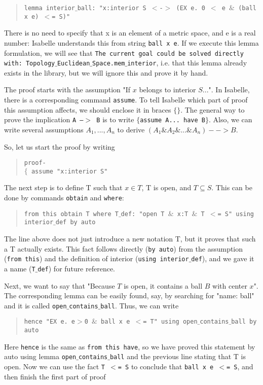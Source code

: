 \documentclass[11pt]{article}
\newcommand{\prog}[1]{\par\noindent\begin{quote}#1\end{quote}\par\noindent}
\begin{document}
\prog{\tt lemma interior$\_$ball: "x:interior S $<$-$>$ (EX e. 0 $<$ e $\&$ (ball x e) $<$= S)"}%

There is no need to specify that x is an element of a metric space, and e is a real number: Isabelle understands this from string {\tt ball x e}. If we execute this lemma formulation, we will see that {\tt The current goal could be solved directly with:~Topology$\_$Euclidean$\_$Space.mem$\_$interior}, i.e. that this lemma already exists in the library, but we will ignore this and prove it by hand.

The proof starts with the assumption "If $x$ belongs to interior $S$...". In Isabelle, there is a corresponding command {\tt assume}. To tell Isabelle which part of proof this assumption affects, we should enclose it in braces {\tt $\{\}$}. The general way to prove the implication {\tt A --$>$ B} is to write {\tt $\{$assume A... have B$\}$}. Also, we can write several assumptions {\tt $A_1,...,A_n$} to derive {\tt $(A_1 \& A_2 \& ...\& A_n) --> B$}.

So, let us start the proof by writing

\prog{\tt proof-\\
    $\{$ assume "x:interior S"}%

The next step is to define T such that $x\in T$, T is open, and $T\subseteq S$. This can be done by commands {\tt obtain} and {\tt where}:

\prog{\tt from this obtain T where T$\_$def: "open T $\&$ x:T $\&$ T $<$= S" using interior$\_$def by auto}%

The line above does not just introduce a new notation T, but it proves that such a T actually exists. This fact follows directly ({\tt by auto}) from the assumption ({\tt from this}) and the definition of interior ({\tt using interior$\_$def}), and we gave it a name ({\tt T$\_$def}) for future reference.

Next, we want to say that "Because $T$ is open, it contains a ball $B$ with center $x$". The corresponding lemma can be easily found, say, by searching for "name: ball" and it is called {\tt open$\_$contains$\_$ball}. Thus, we can write

\prog{\tt hence "EX e. e$>$0 $\&$ ball x e $<$= T" using open$\_$contains$\_$ball by auto}%

Here {\tt hence} is the same as {\tt from this have}, so we have proved this statement by auto using lemma {\tt open$\_$contains$\_$ball} and the previous line stating that T is open. Now we can use the fact {\tt T $<$= S} to conclude that {\tt ball x e $<$= S}, and then finish the first part of proof
\end{document}
